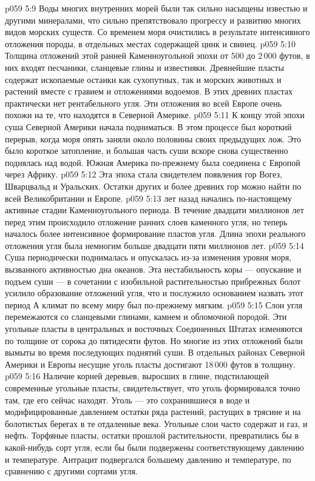 \vs p059 5:9 Воды многих внутренних морей были так сильно насыщены известью и другими минералами, что сильно препятствовало прогрессу и развитию многих видов морских существ. Со временем моря очистились в результате интенсивного отложения породы, в отдельных местах содержащей цинк и свинец.
\vs p059 5:10 Толщина отложений этой ранней Каменноугольной эпохи от 500 до 2\,000 футов, в них входят песчаники, сланцевые глины и известняки. Древнейшие пласты содержат ископаемые останки как сухопутных, так и морских животных и растений вместе с гравием и отложениями водоемов. В этих древних пластах практически нет рентабельного угля. Эти отложения во всей Европе очень похожи на те, что находятся в Северной Америке.
\vs p059 5:11 К концу этой эпохи суша Северной Америки начала подниматься. В этом процессе был короткий перерыв, когда моря опять заняли около половины своих предыдущих лож. Это было короткое затопление, и большая часть суши вскоре снова существенно поднялась над водой. Южная Америка по\hyp{}прежнему была соединена с Европой через Африку.
\vs p059 5:12 Эта эпоха стала свидетелем появления гор Вогез, Шварцвальд и Уральских. Остатки других и более древних гор можно найти по всей Великобритании и Европе.
\vs p059 5:13 \pc {} лет назад начались по\hyp{}настоящему активные стадии Каменноугольного периода. В течение двадцати миллионов лет перед этим происходило отложение ранних слоев каменного угля, но теперь началось более интенсивное формирование пластов угля. Длина эпохи реального отложения угля была немногим больше двадцати пяти миллионов лет.
\vs p059 5:14 Суша периодически поднималась и опускалась из\hyp{}за изменения уровня моря, вызванного активностью дна океанов. Эта нестабильность коры --- опускание и подъем суши --- в сочетании с изобильной растительностью прибрежных болот усилило образование отложений угля, что и послужило основанием назвать этот период  А климат по всему миру был по\hyp{}прежнему мягким.
\vs p059 5:15 Слои угля перемежаются со сланцевыми глинами, камнем и обломочной породой. Эти угольные пласты в центральных и восточных Соединенных Штатах изменяются по толщине от сорока до пятидесяти футов. Но многие из этих отложений были вымыты во время последующих поднятий суши. В отдельных районах Северной Америки и Европы несущие уголь пласты достигают 18\,000 футов в толщину.
\vs p059 5:16 Наличие корней деревьев, выросших в глине, подстилающей современные угольные пласты, свидетельствует, что уголь формировался точно там, где его сейчас находят. Уголь --- это сохранившиеся в воде и модифицированные давлением остатки ряда растений, растущих в трясине и на болотистых берегах в те отдаленные века. Угольные слои часто содержат и газ, и нефть. Торфяные пласты, остатки прошлой растительности, превратились бы в какой\hyp{}нибудь сорт угля, если бы были подвержены соответствующему давлению и температуре. Антрацит подвергался большему давлению и температуре, по сравнению с другими сортами угля.
